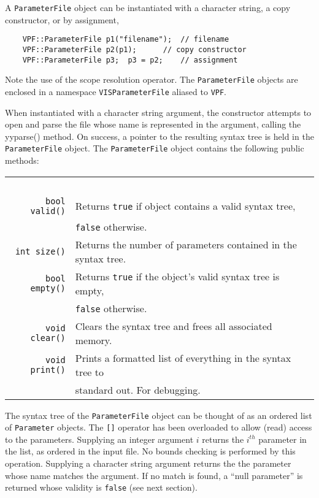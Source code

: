 \documentclass{article}
\newcommand{\code}[1]{\texttt{#1}}
\begin{document}
A \code{ParameterFile} object can be instantiated with a character string,
a copy constructor, or by assignment,
\begin{verbatim}
	VPF::ParameterFile p1("filename");  // filename
	VPF::ParameterFile p2(p1);	    // copy constructor
	VPF::ParameterFile p3;  p3 = p2;    // assignment
\end{verbatim}
Note the use of the scope resolution operator.  The \code{ParameterFile} objects 
are enclosed in a namespace \code{VISParameterFile} aliased to \code{VPF}.

When instantiated with a character string argument, the constructor attempts to open
and parse the file whose name is represented in the argument, calling
the yyparse() method.  On success, a pointer to the resulting syntax tree is
held in the \code{ParameterFile} object.  
The \code{ParameterFile} object contains the following public methods:

\begin{tabular}[c]{rl}
\ \\
\code{bool valid()} & Returns \code{true} if object contains a valid syntax tree, \\&
\code{false} otherwise.\\
\code{int size()} & Returns the number of parameters contained in the syntax
tree.\\
\code{bool empty()} & Returns \code{true} if the object's valid syntax tree is empty,\\&
\code{false} otherwise.\\
\code{void clear()} & Clears the syntax tree and frees all associated memory.\\
\code{void print()} & Prints a formatted list of everything in the syntax tree
to \\& standard out.  For debugging.
\ \\
\end{tabular}
\newline

The syntax tree of the \code{ParameterFile} object can be thought of as an 
ordered list of \code{Parameter} objects.  The \code{[]} operator has been
overloaded to allow (read) access to the parameters.  Supplying an integer
argument $i$ returns the $i^{\mathit{th}}$ parameter in the list, as ordered in
the input file.  No bounds checking is performed by this operation. Supplying a 
character string argument returns the the parameter whose name matches the argument.  
If no match is found, a ``null parameter'' is returned whose validity is 
\code{false} (see next section).
\end{document}
